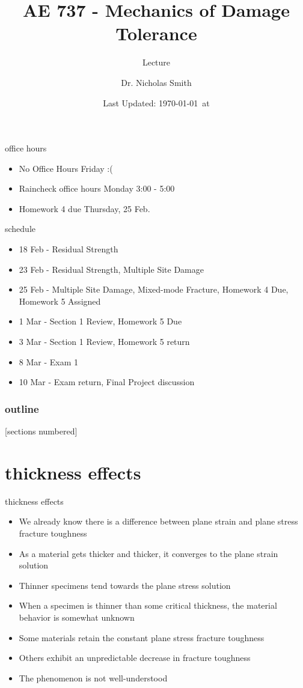 \documentclass[10pt]{beamer}
\title{AE 737 - Mechanics of Damage Tolerance}
\subtitle{Lecture \arabic{lecture}}
\date{Last Updated: \today\ at \DTMcurrenttime}
\author{Dr. Nicholas Smith}
\institute{Wichita State University, Department of Aerospace Engineering}
\begin{document}
\maketitle
\begin{frame}{office hours}
	\begin{itemize}
		\item No Office Hours Friday :(
		\item Raincheck office hours Monday 3:00 - 5:00
		\item Homework 4 due Thursday, 25 Feb.
	\end{itemize}
\end{frame}

\begin{frame}{schedule}
	\begin{itemize}
		\item 18 Feb - Residual Strength
		\item 23 Feb - Residual Strength, Multiple Site Damage
		\item 25 Feb - Multiple Site Damage, Mixed-mode Fracture, Homework 4 Due, Homework 5 Assigned
		\item 1 Mar - Section 1 Review, Homework 5 Due
		\item 3 Mar - Section 1 Review, Homework 5 return
		\item 8 Mar - Exam 1
		\item 10 Mar - Exam return, Final Project discussion
	\end{itemize}
\end{frame}

\begin{frame}
  \frametitle{outline}
  [sections numbered]
  \tableofcontents[hideallsubsections]
\end{frame}

\section{thickness effects}

\begin{frame}{thickness effects}
	\begin{itemize}[<+->]
		\item We already know there is a difference between plane strain and plane stress fracture toughness
		\item As a material gets thicker and thicker, it converges to the plane strain solution
		\item Thinner specimens tend towards the plane stress solution
		\item When a specimen is thinner than some critical thickness, the material behavior is somewhat unknown
		\item Some materials retain the constant plane stress fracture toughness
		\item Others exhibit an unpredictable decrease in fracture toughness
		\item The phenomenon is not well-understood
	\end{itemize}
\end{frame}
\end{document}
